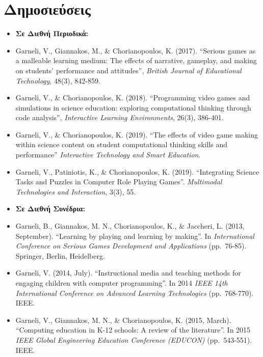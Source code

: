 \documentclass[%
    11pt,
  oneside
  ]{memoir}
\let\oldsection\section
\renewcommand{\section}[1]{%
  \oldsection{#1}
  \leavevmode
  \par
  \vspace{\dimexpr-\baselineskip-\parskip}
}
\begin{document}
\hypertarget{ux3b4ux3b7ux3bcux3bfux3c3ux3b9ux3b5ux3cdux3c3ux3b5ux3b9ux3c2}{%
\section{Δημοσιεύσεις}\label{ux3b4ux3b7ux3bcux3bfux3c3ux3b9ux3b5ux3cdux3c3ux3b5ux3b9ux3c2}}

\begin{itemize}
\tightlist
\item
  \textbf{Σε Διεθνή Περιοδικά:}
\item
  Garneli, V., Giannakos, M., \& Chorianopoulos, K. (2017). ``Serious
  games as a malleable learning medium: The effects of narrative,
  gameplay, and making on students' performance and attitudes'',
  \emph{British Journal of Educational Technology}, 48(3), 842-859.
\item
  Garneli, V., \& Chorianopoulos, K. (2018). ``Programming video games
  and simulations in science education: exploring computational thinking
  through code analysis'', \emph{Interactive Learning Environments},
  26(3), 386-401.
\item
  Garneli, V., \& Chorianopoulos, K. (2019). ``The effects of video game
  making within science content on student computational thinking skills
  and performance'' \emph{Interactive Technology and Smart Education}.
\item
  Garneli, V., Patiniotis, K., \& Chorianopoulos, K. (2019).
  ``Integrating Science Tasks and Puzzles in Computer Role Playing
  Games''. \emph{Multimodal Technologies and Interaction}, 3(3), 55.
\item
  \textbf{Σε Διεθνή Συνέδρια:}
\item
  Garneli, B., Giannakos, M. N., Chorianopoulos, K., \& Jaccheri, L.
  (2013, September). ``Learning by playing and learning by making''. In
  \emph{International Conference on Serious Games Development and
  Applications} (pp.~76-85). Springer, Berlin, Heidelberg.
\item
  Garneli, V. (2014, July). ``Instructional media and teaching methods
  for engaging children with computer programming''. In 2014 \emph{IEEE
  14th International Conference on Advanced Learning Technologies}
  (pp.~768-770). IEEE.
\item
  Garneli, V., Giannakos, M. N., \& Chorianopoulos, K. (2015, March).
  ``Computing education in K-12 schools: A review of the literature''.
  In 2015 \emph{IEEE Global Engineering Education Conference (EDUCON)}
  (pp.~543-551). IEEE.\\

\end{itemize}
\end{document}
